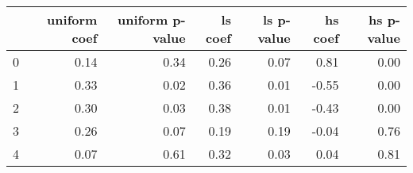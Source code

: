 \begin{tabular}{lrrrrrr}
\toprule
 & uniform coef & uniform p-value & ls coef & ls p-value & hs coef & hs p-value \\
\midrule
0 & 0.14 & 0.34 & 0.26 & 0.07 & 0.81 & 0.00 \\
1 & 0.33 & 0.02 & 0.36 & 0.01 & -0.55 & 0.00 \\
2 & 0.30 & 0.03 & 0.38 & 0.01 & -0.43 & 0.00 \\
3 & 0.26 & 0.07 & 0.19 & 0.19 & -0.04 & 0.76 \\
4 & 0.07 & 0.61 & 0.32 & 0.03 & 0.04 & 0.81 \\
\bottomrule
\end{tabular}
